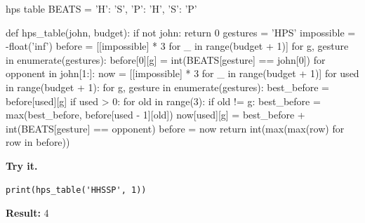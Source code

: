 \documentclass[11pt,a4paper,oneside]{report}
\begin{document}
\begin{bookcode}{hps table}
BEATS = {'H': 'S', 'P': 'H', 'S': 'P'}

def hps_table(john, budget):
    if not john:
        return 0
    gestures = 'HPS'
    impossible = -float('inf')
    before = [[impossible] * 3 for _ in range(budget + 1)]
    for g, gesture in enumerate(gestures):
        before[0][g] = int(BEATS[gesture] == john[0])
    for opponent in john[1:]:
        now = [[impossible] * 3 for _ in range(budget + 1)]
        for used in range(budget + 1):
            for g, gesture in enumerate(gestures):
                best_before = before[used][g]
                if used > 0:
                    for old in range(3):
                        if old != g:
                            best_before = max(best_before, before[used - 1][old])
                now[used][g] = best_before + int(BEATS[gesture] == opponent)
        before = now
    return int(max(max(row) for row in before))
\end{bookcode}
\textbf{Try it.}

\begin{lstlisting}
print(hps_table('HHSSP', 1))
\end{lstlisting}
\textbf{Result:} 4
\end{document}
